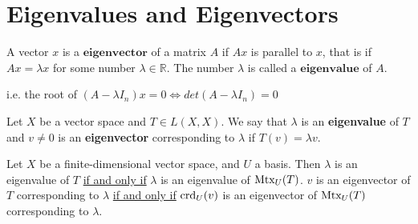 \documentclass[11pt]{elegantbook}
\begin{document}
\section{Eigenvalues and Eigenvectors}
\begin{definition}
    \normalfont
    A vector $x$ is a $\textbf{eigenvector}$ of a matrix $A$ if $Ax$ is parallel to $x$, that is if $Ax = \lambda x$ for some number $\lambda\in \mathbb{R}$. The number $\lambda$ is called a $\textbf{eigenvalue}$ of $A$.

    i.e. the root of $(A-\lambda I_n)x=0\Leftrightarrow det(A-\lambda I_n)=0$
\end{definition}

\begin{definition}
    \normalfont
    Let $X$ be a vector space and $T \in L(X, X)$. We say that $\lambda$ is an \textbf{eigenvalue} of $T$ and $v\neq 0$ is an \textbf{eigenvector} corresponding to $\lambda$ if $T (v) = \lambda v$.
\end{definition}


\begin{theorem}
    Let $X$ be a finite-dimensional vector space, and $U$ a basis. Then $\lambda$ is an eigenvalue of $T$ \underline{if and only if} $\lambda$ is an eigenvalue of $\textnormal{Mtx}_U(T)$. $v$ is an eigenvector of $T$ corresponding to $\lambda$ \underline{if and only if} $\textnormal{crd}_U(v)$ is an eigenvector of $\textnormal{Mtx}_U(T)$ corresponding to $\lambda$.
\end{theorem}
\end{document}
